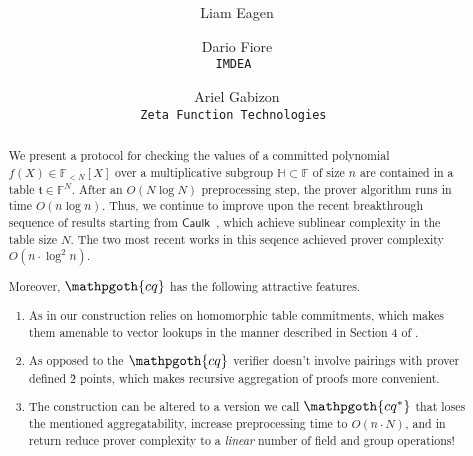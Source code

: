 \documentclass[11pt]{article} %
\title{ \bf \papertitle \\[0.72cm]}
\author{ Liam Eagen \and  Dario Fiore \\ \tt{IMDEA}  \and Ariel Gabizon \\ \tt{Zeta Function Technologies} }
\newcommand{\cq}{\ensuremath{\mathpgoth{cq} }\xspace}
\newcommand{\cqstar}{\ensuremath{\mathpgoth{cq^{\mathbf{*}} }}\xspace}
\newcommand{\caulk}{\ensuremath{\mathsf{Caulk}}\xspace}
\newcommand{\F}{\ensuremath{\mathbb F}\xspace}
\newcommand{\polysofdeg}[1]{\ensuremath{\F_{< #1}[X]}\xspace}
\newcommand{\subspace}{\ensuremath{\mathbb{H}}\xspace}
\newcommand{\witsize}{\ensuremath{n}\xspace}
\newcommand{\tabsize}{\ensuremath{N}\xspace}
\newcommand{\tab}{\ensuremath{\mathfrak{t}}\xspace}
\begin{document}
    \maketitle
\begin{abstract}
 We present a protocol for checking the values of a committed polynomial $f(X)\in \polysofdeg{\tabsize}$ over a multiplicative subgroup $\subspace\subset \F$ of size \witsize are contained in a
 table $\tab\in \F^\tabsize$. After an $O(\tabsize \log \tabsize)$ preprocessing step, the prover algorithm runs in time $O(\witsize\log \witsize)$.
 Thus, we continue to improve upon the recent breakthrough sequence of results\cite{caulk,caulkp,flookup,baloo} starting from \caulk~\cite{caulk}, which achieve sublinear complexity in the table size \tabsize. The two most recent works in this seqence \cite{flookup,baloo} achieved
 prover complexity $O(\witsize\cdot \log^2 \witsize)$.
 
 Moreover, \cq has the following attractive features.
 \begin{enumerate}
  \item As in \cite{caulk,caulkp,baloo} our construction relies on homomorphic table commitments, which makes them amenable to vector lookups in the manner described in Section 4 of \cite{plookup}.
 \item As opposed to \cite{caulk,caulkp,flookup,baloo} the \cq verifier doesn't involve pairings with prover defined \G2 points, which makes recursive aggregation of proofs more convenient.
 
\item The construction can be altered to a version we call \cqstar that loses the mentioned aggregatability, increase preprocessing time to $O(\witsize\cdot \tabsize)$, and in return reduce prover complexity to a \emph{linear} number of field and group operations!
 \end{enumerate}
 \end{abstract}

\end{document}
